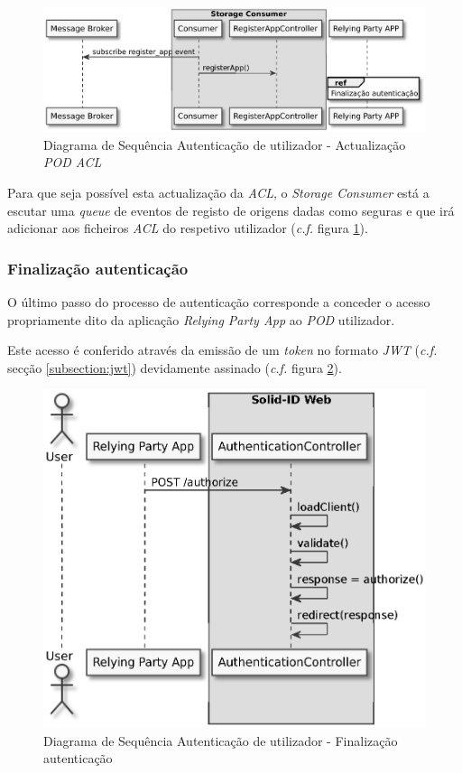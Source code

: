 \begin{figure}[H]
    \begin{center}
    \includegraphics[height=0.3 \textwidth]{figures/authentication_sd_3.eps}
    \caption{Diagrama de Sequência Autenticação de utilizador - Actualização \emph{\acrshort{POD} \acrshort{ACL}}}
    \label{autenticacao_sd3}
    \end{center}
\end{figure}

Para que seja possível esta actualização da \emph{\acrshort{ACL}}, o \emph{Storage Consumer} está a escutar uma \emph{queue} de eventos de registo de origens dadas como seguras e que irá adicionar aos ficheiros \emph{\acrshort{ACL}} do respetivo utilizador (\emph{c.f.} figura \ref{autenticacao_sd3}).

\subsubsection{Finalização autenticação}
O último passo do processo de autenticação corresponde a conceder o acesso propriamente dito da aplicação \emph{Relying Party App} ao \emph{\acrshort{POD}} utilizador.

Este acesso é conferido através da emissão de um \emph{token} no formato \emph{\acrshort{JWT}} (\emph{c.f.} secção \ref{subsection:jwt}) devidamente assinado (\emph{c.f.} figura \ref{autenticacao_sd4}).

\begin{figure}[H]
    \begin{center}
    \includegraphics[width=0.6 \textwidth]{figures/authentication_sd_4.eps}
    \caption{Diagrama de Sequência Autenticação de utilizador - Finalização autenticação}
    \label{autenticacao_sd4}
    \end{center}
\end{figure}

